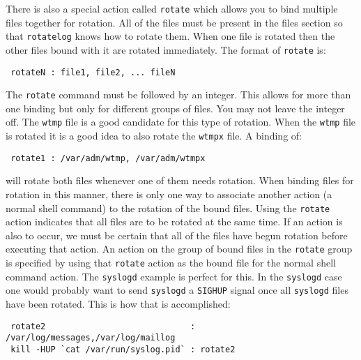 \documentclass{article}
\begin{document}
There is also a special action called {\tt rotate} which allows you to bind
multiple files together for rotation.  All of the files must be present
in the files section so that {\tt rotatelog} knows how to rotate them.
When one file is rotated then the other files bound with it are rotated
immediately.  The format of {\tt rotate} is:
\begin{verbatim}
 rotateN : file1, file2, ... fileN
\end{verbatim}

The {\tt rotate} command must be followed by an integer.  This allows for
more than one binding but only for different groups of files.  You may
not leave the integer off.  The {\tt wtmp} file is a good candidate for
this type of rotation.  When the {\tt wtmp} file is rotated it is a good
idea to also rotate the {\tt wtmpx} file.  A binding of:
\begin{verbatim}
 rotate1 : /var/adm/wtmp, /var/adm/wtmpx
\end{verbatim}

will rotate both files whenever one of them needs rotation.  When
binding files for rotation in this manner, there is only one way to
associate another action (a normal shell command) to the rotation of the
bound files.  Using the {\tt rotate} action indicates that all files are to
be rotated at the same time.  If an action is also to occur, we must be
certain that all of the files have begun rotation before executing that
action.  An action on the group of bound files in the {\tt rotate} group is
specified by using that {\tt rotate} action as the bound file for the
normal shell command action.  The {\tt syslogd} example is perfect for
this.  In the {\tt syslogd} case one would probably want to send {\tt syslogd}
a {\tt SIGHUP} signal once all {\tt syslogd} files have been rotated.  This is
how that is accomplished:
\begin{verbatim}
 rotate2                             : /var/log/messages,/var/log/maillog
 kill -HUP `cat /var/run/syslog.pid` : rotate2
\end{verbatim}
\end{document}

